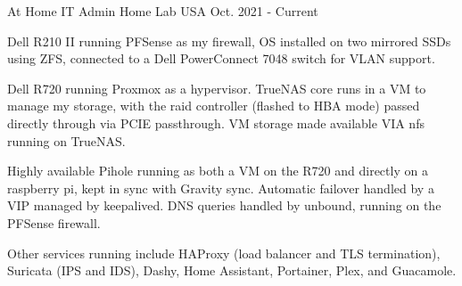 \begin{cventries}
  \cventry
    {At Home IT Admin} %
    {Home Lab} %
    {USA} %
    {Oct. 2021 - Current} %
    {
      \begin{cvitems} %
        \item {Dell R210 II running PFSense as my firewall, OS installed on two mirrored SSDs using ZFS, connected to a Dell PowerConnect 7048 switch for VLAN support.}
        \item {Dell R720 running Proxmox as a hypervisor. TrueNAS core runs in a VM to manage my storage, with the raid controller (flashed to HBA mode) passed directly through via PCIE passthrough. VM storage made available VIA nfs running on TrueNAS.}
        \item {Highly available Pihole running as both a VM on the R720 and directly on a raspberry pi, kept in sync with Gravity sync. Automatic failover handled by a VIP managed by keepalived. DNS queries handled by unbound, running on the PFSense firewall.}
        \item {Other services running include HAProxy (load balancer and TLS termination), Suricata (IPS and IDS), Dashy, Home Assistant, Portainer, Plex, and Guacamole.}
      \end{cvitems}
    }

\end{cventries}
